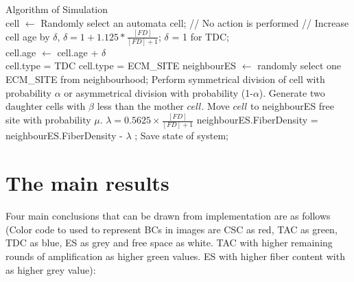 \begin{algorithm}[H]
	\label{algo}
	\SetAlgoLined
	\noindent Algorithm of Simulation\\
	{
		{
			cell  $\gets$ Randomly select an automata cell;			
			{
				// No action is performed
			}
			{   
				// Increase cell age by $\delta$, $\delta =  1 + 1.125 *  \frac{[FD]}{[FD]+1}$; $\delta$ = 1 for TDC; \\
				cell.age  $\gets$ cell.age + $\delta$  \\				
				{
					{				      
						cell.type = TDC
					}					
					{ 
						cell.type = ECM\_SITE
					}
				}
				{
					neighbourES  $\gets$ randomly select one ECM\_SITE from neighbourhood;										
					{				      						
						{
							{				      
								Perform symmetrical division of cell with probability $\alpha$ or asymmetrical division with probability (1-$\alpha$).
							}
							{ 					  
								Generate two daughter cells with $\beta$ less than the mother $cell$.
							}	
						}
						{				    
							Move $cell$ to neighbourES free site with probability $\mu$.   	      
						}						
					}
					{												
						$\lambda = 0.5625\times \frac{{[FD]}}{[FD]+1} $\; 
						neighbourES.FiberDensity = neighbourES.FiberDensity - $\lambda$ ;
					}
				}								
			}	   	   			
		}
		Save state of system;
	}
\end{algorithm}


\section{The main results}
Four main conclusions that can be drawn from implementation are as follows 
(Color code to used to represent BCs in images are CSC as red, TAC as green, TDC as blue, ES as grey and free space as white. 
TAC with higher remaining rounds of amplification as higher green values.
ES with higher fiber content with as higher grey value):
 
